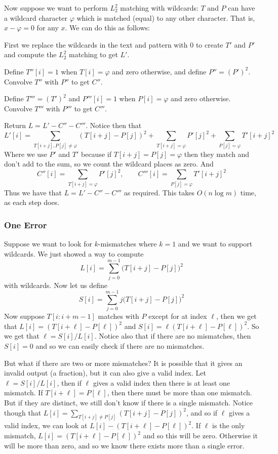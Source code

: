 Now suppose we want to perform $L_2^2$ matching with wildcards: $T$ and $P$ can have a wildcard character $\varphi$ which is matched (equal) to any other character.
That is, $x-\varphi=0$ for any $x$.
We can do this as follows:
\benum
    \item First we replace the wildcards in the text and pattern with $0$ to create $T'$ and $P'$ and compute the $L_2^2$ matching to get $L'$.
    \item Define $T''[i]=1$ when $T[i]=\varphi$ and zero otherwise, and define $P''=(P')^2$.
        Convolve $T''$ with $P''$ to get $C''$.
    \item Define $T'''=(T')^2$ and $P'''[i]=1$ when $P[i]=\varphi$ and zero otherwise.
        Convolve $T'''$ with $P'''$ to get $C'''$.
    \item Return $L=L'-C''-C'''$.
\eenum
Notice then that
$$ L'[i] = \sum_{T[i+j],P[j]\neq\varphi}(T[i+j]-P[j])^2 + \sum_{T[i+j]=\varphi}P'[j]^2 + \sum_{P[j]=\varphi}T'[i+j]^2 $$
Where we use $P'$ and $T'$ because if $T[i+j]=P[j]=\varphi$ then they match and don't add to the sum, so we count the wildcard places as zero.
And
$$ C''[i] = \sum_{T[i+j]=\varphi}P'[j]^2,\qquad C'''[i] = \sum_{P[j]=\varphi}T'[i+j]^2 $$
Thus we have that $L=L'-C''-C'''$ as required.
This takes $O(n\log m)$ time, as each step does.

\subsubsection{One Error}

Suppose we want to look for $k$-mismatches where $k=1$ and we want to support wildcards.
We just showed a way to compute
$$ L[i] = \sum_{j=0}^{m-1}\bigl(T[i+j]-P[j]\bigr)^2 $$
with wildcards.
Now let us define
$$ S[i] = \sum_{j=0}^{m-1}j\bigl(T[i+j]-P[j]\bigr)^2 $$
Now suppose $T[i:i+m-1]$ matches with $P$ except for at index $\ell$, then we get that $L[i]=(T[i+\ell]-P[\ell])^2$ and $S[i]=\ell(T[i+\ell]-P[\ell])^2$.
So we get that $\ell=S[i]/L[i]$.
Notice also that if there are no mismatches, then $S[i]=0$ and so we can easily check if there are no mismatches.

But what if there are two or more mismatches?
It is possible that it gives an invalid output (a fraction), but it can also give a valid index.
Let $\ell=S[i]/L[i]$, then if $\ell$ gives a valid index then there is at least one mismatch.
If $T[i+\ell]=P[\ell]$, then there must be more than one mismatch.
But if they are distinct, we still don't know if there is a single mismatch.
Notice though that $L[i]=\sum_{T[i+j]\neq P[j]}(T[i+j]-P[j])^2$, and so if $\ell$ gives a valid index, we can look at $L[i]-(T[i+\ell]-P[\ell])^2$.
If $\ell$ is the only mismatch, $L[i]=(T[i+\ell]-P[\ell])^2$ and so this will be zero.
Otherwise it will be more than zero, and so we know there exists more than a single error.

